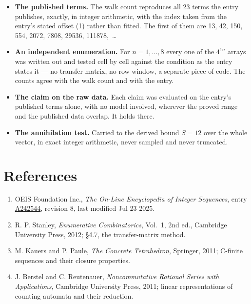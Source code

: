 \documentclass[11pt]{article}
\theoremstyle{definition}
\begin{document}
\begin{itemize}

\item {\bfseries The published terms.} The walk count reproduces all 23 terms the entry publishes, exactly, in integer arithmetic, with the index taken from the entry's stated offset (1) rather than fitted. The first of them are 13, 42, 150, 554, 2072, 7808, 29536, 111878,~\dots

\item {\bfseries An independent enumeration.} For $n = 1,\dots,8$ every one of the $4^{1n}$ arrays was written out and tested cell by cell against the condition as the entry states it --- no transfer matrix, no row window, a separate piece of code. The counts agree with the walk count and with the entry.

\item {\bfseries The claim on the raw data.} Each claim was evaluated on the entry's published terms alone, with no model involved, wherever the proved range and the published data overlap. It holds there.

\item {\bfseries The annihilation test.} Carried to the derived bound $S = 12$ over the whole vector, in exact integer arithmetic, never sampled and never truncated.

\end{itemize}

\section{References}

\begin{enumerate}

\item OEIS Foundation Inc., \emph{The On-Line Encyclopedia of Integer Sequences}, entry \href{https://oeis.org/A242544}{A242544}, revision 8, last modified Jul 23 2025.

\item R. P. Stanley, \emph{Enumerative Combinatorics}, Vol.~1, 2nd ed., Cambridge University Press, 2012; \S4.7, the transfer-matrix method.

\item M. Kauers and P. Paule, \emph{The Concrete Tetrahedron}, Springer, 2011; C-finite sequences and their closure properties.

\item J. Berstel and C. Reutenauer, \emph{Noncommutative Rational Series with Applications}, Cambridge University Press, 2011; linear representations of counting automata and their reduction.

\end{enumerate}
\end{document}
